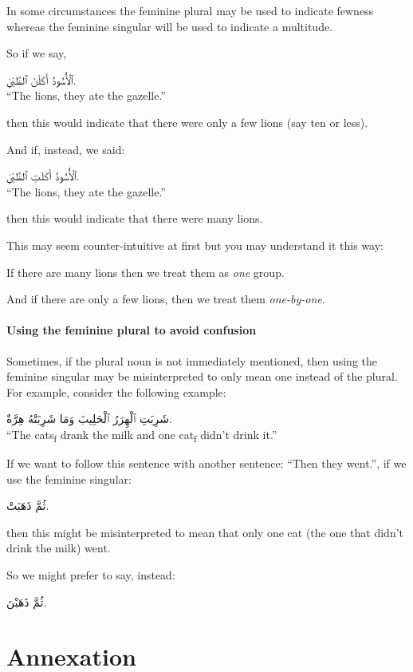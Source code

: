 \documentclass[
  10pt,
]{book}
\begin{document}
In some circumstances
the feminine plural may be used to indicate fewness
whereas
the feminine singular will be used to indicate a multitude.

So if we say,

\foreignlanguage{arabic}{ٱلْأُسُودُ أَکَلْنَ ٱلظَّبْيَ.}\\
\enquote{The lions, they ate the gazelle.}

then this would indicate that there were only a few lions (say ten or less).

And if, instead, we said:

\foreignlanguage{arabic}{ٱلْأُسُودُ أَکَلَتِ ٱلظَّبْيَ.}\\
\enquote{The lions, they ate the gazelle.}

then this would indicate that there were many lions.

This may seem counter-intuitive at first but you may understand it this way:

If there are many lions then we treat them as \emph{one} group.

And if there are only a few lions, then we treat them \emph{one-by-one}.

\subsubsection{Using the feminine plural to avoid confusion}\label{using-the-feminine-plural-to-avoid-confusion}

Sometimes, if the plural noun is not immediately mentioned, then using the feminine singular may be misinterpreted to only mean one instead of the plural. For example, consider the following example:

\foreignlanguage{arabic}{شَرِبَتِ ٱلْهِرَرُ ٱلْحَلِيبَ وَمَا شَرِبَتْهُ هِرَّةٌ.}\\
\enquote{The cats\textsubscript{f} drank the milk and one cat\textsubscript{f} didn't drink it.}

If we want to follow this sentence with another sentence: \enquote{Then they went.}, if we use the feminine singular:

\foreignlanguage{arabic}{ثُمَّ ذَهَبَتْ.}

then this might be misinterpreted to mean that only one cat (the one that didn't drink the milk) went.

So we might prefer to say, instead:

\foreignlanguage{arabic}{ثُمَّ ذَهَبْنَ.}

\chapter{Annexation}\label{annexation}
\end{document}
